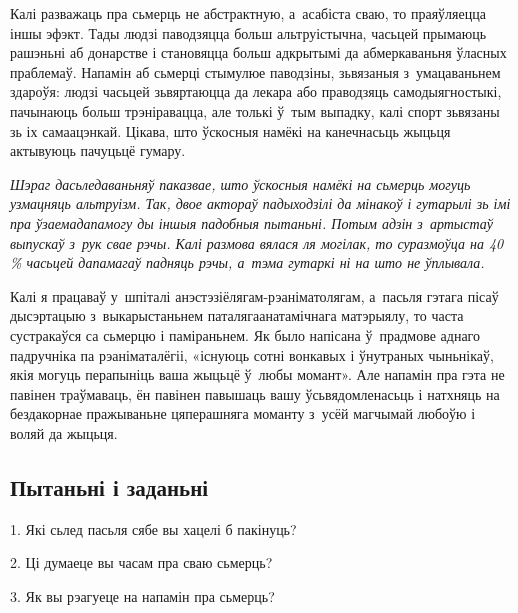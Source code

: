 
Калі разважаць пра сьмерць не абстрактную, а~асабіста сваю, то праяўляецца іншы эфэкт. Тады людзі паводзяцца больш альтруістычна, часьцей прымаюць рашэньні аб донарстве і становяцца больш адкрытымі да абмеркаваньня ўласных праблемаў. Напамін аб сьмерці стымулюе паводзіны, зьвязаныя з~умацаваньнем здароўя: людзі часьцей зьвяртаюцца да лекара або праводзяць самодыягностыкі, пачынаюць больш трэніравацца, але толькі ў~тым выпадку, калі спорт зьвязаны зь іх самаацэнкай. Цікава, што ўскосныя намёкі на канечнасьць жыцьця актывуюць пачуцьцё гумару.

\emph{Шэраг дасьледаваньняў паказвае, што ўскосныя намёкі на сьмерць могуць узмацняць альтруізм. Так, двое актораў падыходзілі да мінакоў і гутарылі зь імі пра ўзаемадапамогу ды іншыя падобныя пытаньні. Потым адзін з~артыстаў выпускаў з~рук свае рэчы. Калі размова вялася ля могілак, то суразмоўца на 40\,\% часьцей дапамагаў падняць рэчы, а~тэма гутаркі ні на што не ўплывала.}

Калі я працаваў у~шпіталі анэстэзіёлягам-рэаніматолягам, а~пасьля гэтага пісаў дысэртацыю з~выкарыстаньнем паталягаанатамічнага матэрыялу, то часта сустракаўся са сьмерцю і паміраньнем. Як было напісана ў~прадмове аднаго падручніка па рэаніматалёгіі, «існуюць сотні вонкавых і ўнутраных чыньнікаў, якія могуць перапыніць ваша жыцьцё ў~любы момант». Але напамін пра гэта не павінен траўмаваць, ён павінен павышаць вашу ўсьвядомленасьць і натхняць на бездакорнае пражываньне цяперашняга моманту з~усёй магчымай любоўю і воляй да жыцьця.

\subsection*{Пытаньні і заданьні}

1. Які сьлед пасьля сябе вы хацелі б пакінуць?

2. Ці думаеце вы часам пра сваю сьмерць?

3. Як вы рэагуеце на напамін пра сьмерць?
